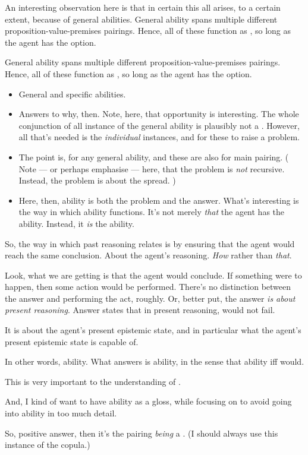 \begin{note}
  An interesting observation here is that in certain this all arises, to a certain extent, because of general abilities.
  General ability spans multiple different proposition-value-premises pairings.
  Hence, all of these function as , so long as the agent has the option.

  General ability spans multiple different proposition-value-premises pairings.
  Hence, all of these function as , so long as the agent has the option.

  \begin{itemize}
  \item
    General and specific abilities.
  \item
    Answers to why, then.
    Note, here, that opportunity is interesting.
    The whole conjunction of all instance of the general ability is plausibly not a \requ{}.
    However, all that's needed is the \emph{individual} instances, and for these to raise a problem.
  \item
    The point is,  for any general ability, and these are also  for main pairing.
    (%
    Note --- or perhaps emphasise --- here, that the problem is \emph{not} recursive.
    Instead, the problem is about the spread.%
    )
  \item
    Here, then, ability is both the problem and the answer.
    What's interesting is the way in which ability functions.
    It's not merely \emph{that} the agent has the ability.
    Instead, it \emph{is} the ability.
  \end{itemize}
\end{note}

\begin{note}
  So, the way in which past reasoning relates is by ensuring that the agent would reach the same conclusion.
  About the agent's reasoning.
  \emph{How} rather than \emph{that}.

  Look, what we are getting is that the agent would conclude.
  If something were to happen, then some action would be performed.
  There's no distinction between the answer and performing the act, roughly.
  Or, better put, the answer \emph{is about present reasoning}.
  Answer states that in present reasoning, would not fail.


  It is about the agent's present epistemic state, and in particular what the agent's present epistemic state is capable of.

  In other words, ability.
  What answers is ability, in the sense that ability iff would.

  This is very important to the understanding of \fc{}.

  And, I kind of want to have ability as a gloss, while focusing on \fc{} to avoid going into ability in too much detail.

  So, positive answer, then it's the pairing \emph{being} a \fc{}.
  (I should always use this instance of the copula.)
\end{note}

